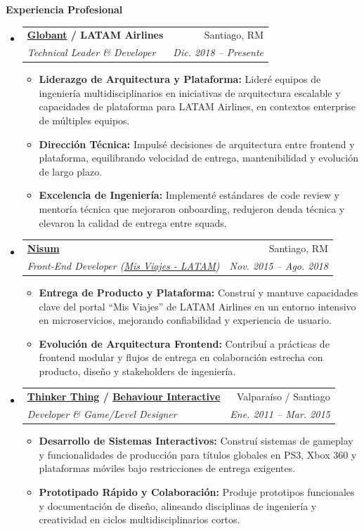\documentclass[letterpaper,11pt]{article}
\makeatletter
\newcommand{\resitem}[1]{\item #1 \vspace{-2pt}}
\newcommand{\resheading}[1]{{\large \colorbox{mygrey}{\begin{minipage}{\textwidth}{\textbf{#1 \vphantom{p\^{E}}}}\end{minipage}}}}
\newcommand{\ressubheading}[4]{
    \begin{tabular*}{6.5in}{l@{\extracolsep{\fill}}r}
            \textbf{#1} & #2 \\
            \textit{#3} & \textit{#4} \\
    \end{tabular*}\vspace{-6pt}}
\makeatother
\begin{document}
    \resheading{Experiencia Profesional}
        \begin{itemize}
            \item 
                \ressubheading{\href{https://www.globant.com/}{Globant} / LATAM Airlines}{Santiago, RM}{Technical Leader \& Developer}{Dic. 2018 -- Presente}
                    { \footnotesize
                    \begin{itemize}
                        \resitem{\textbf{Liderazgo de Arquitectura y Plataforma:} Lideré equipos de ingeniería multidisciplinarios en iniciativas de arquitectura escalable y capacidades de plataforma para LATAM Airlines, en contextos enterprise de múltiples equipos.}
                        \resitem{\textbf{Dirección Técnica:} Impulsé decisiones de arquitectura entre frontend y plataforma, equilibrando velocidad de entrega, mantenibilidad y evolución de largo plazo.}
                        \resitem{\textbf{Excelencia de Ingeniería:} Implementé estándares de code review y mentoría técnica que mejoraron onboarding, redujeron deuda técnica y elevaron la calidad de entrega entre squads.}
                    \end{itemize}
                    }
            \item 
                \ressubheading{\href{http://www.nisumlatam.com/}{Nisum}}{Santiago, RM}{Front-End Developer (\href{https://www.latam.com/es_cl/apps/personas/mybookings}{Mis Viajes - LATAM})}{Nov. 2015 -- Ago. 2018}
                    { \footnotesize
                    \begin{itemize}
                        \resitem{\textbf{Entrega de Producto y Plataforma:} Construí y mantuve capacidades clave del portal ``Mis Viajes'' de LATAM Airlines en un entorno intensivo en microservicios, mejorando confiabilidad y experiencia de usuario.}
                        \resitem{\textbf{Evolución de Arquitectura Frontend:} Contribuí a prácticas de frontend modular y flujos de entrega en colaboración estrecha con producto, diseño y stakeholders de ingeniería.}
                    \end{itemize}
                    }
            \item 
                \ressubheading{\href{http://thinkerthing.com/}{Thinker Thing} / \href{https://www.bhvr.com/}{Behaviour Interactive}}{Valparaíso / Santiago}{Developer \& Game/Level Designer}{Ene. 2011 -- Mar. 2015}
                    { \footnotesize
                    \begin{itemize}
                        \resitem{\textbf{Desarrollo de Sistemas Interactivos:} Construí sistemas de gameplay y funcionalidades de producción para títulos globales en PS3, Xbox 360 y plataformas móviles bajo restricciones de entrega exigentes.}
                        \resitem{\textbf{Prototipado Rápido y Colaboración:} Produje prototipos funcionales y documentación de diseño, alineando disciplinas de ingeniería y creatividad en ciclos multidisciplinarios cortos.}
                    \end{itemize}
                    }
        \end{itemize}  %
    
\end{document}

